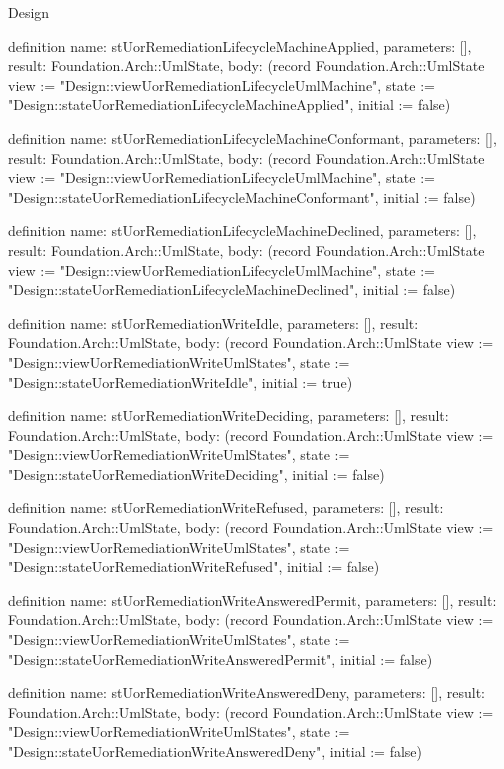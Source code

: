 \begin{lexlean}{Design}
\begin{semanticmodule}
definition{
  name: stUorRemediationLifecycleMachineApplied,
  parameters: [],
  result: Foundation.Arch::UmlState,
  body: (record Foundation.Arch::UmlState {view := "Design::viewUorRemediationLifecycleUmlMachine", state := "Design::stateUorRemediationLifecycleMachineApplied", initial := false})
}

definition{
  name: stUorRemediationLifecycleMachineConformant,
  parameters: [],
  result: Foundation.Arch::UmlState,
  body: (record Foundation.Arch::UmlState {view := "Design::viewUorRemediationLifecycleUmlMachine", state := "Design::stateUorRemediationLifecycleMachineConformant", initial := false})
}

definition{
  name: stUorRemediationLifecycleMachineDeclined,
  parameters: [],
  result: Foundation.Arch::UmlState,
  body: (record Foundation.Arch::UmlState {view := "Design::viewUorRemediationLifecycleUmlMachine", state := "Design::stateUorRemediationLifecycleMachineDeclined", initial := false})
}

definition{
  name: stUorRemediationWriteIdle,
  parameters: [],
  result: Foundation.Arch::UmlState,
  body: (record Foundation.Arch::UmlState {view := "Design::viewUorRemediationWriteUmlStates", state := "Design::stateUorRemediationWriteIdle", initial := true})
}

definition{
  name: stUorRemediationWriteDeciding,
  parameters: [],
  result: Foundation.Arch::UmlState,
  body: (record Foundation.Arch::UmlState {view := "Design::viewUorRemediationWriteUmlStates", state := "Design::stateUorRemediationWriteDeciding", initial := false})
}

definition{
  name: stUorRemediationWriteRefused,
  parameters: [],
  result: Foundation.Arch::UmlState,
  body: (record Foundation.Arch::UmlState {view := "Design::viewUorRemediationWriteUmlStates", state := "Design::stateUorRemediationWriteRefused", initial := false})
}

definition{
  name: stUorRemediationWriteAnsweredPermit,
  parameters: [],
  result: Foundation.Arch::UmlState,
  body: (record Foundation.Arch::UmlState {view := "Design::viewUorRemediationWriteUmlStates", state := "Design::stateUorRemediationWriteAnsweredPermit", initial := false})
}

definition{
  name: stUorRemediationWriteAnsweredDeny,
  parameters: [],
  result: Foundation.Arch::UmlState,
  body: (record Foundation.Arch::UmlState {view := "Design::viewUorRemediationWriteUmlStates", state := "Design::stateUorRemediationWriteAnsweredDeny", initial := false})
}


\end{semanticmodule}
\end{lexlean}
